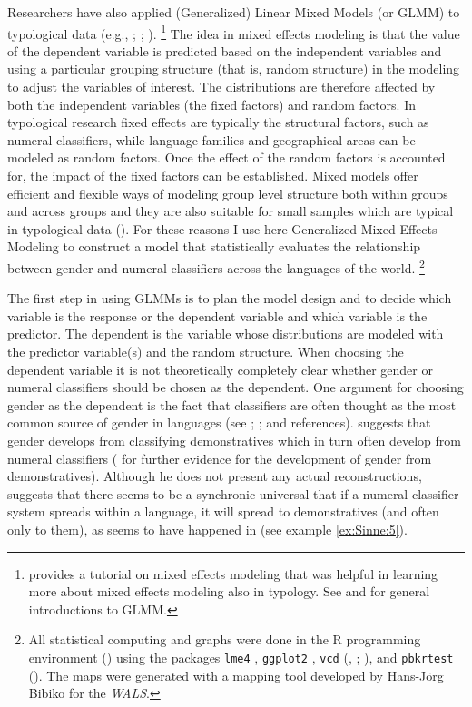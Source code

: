 \documentclass[output=collectionpaper]{langsci/langscibook}
\begin{document}
Researchers have also applied (Generalized) Linear Mixed Models (or GLMM) to typological data (e.g., \citealt{Cysouw2010}; \citealt{Jaeger2011}; \citealt{Bentz2013}).%
\footnote{\citet{Winter2013} provides a tutorial on mixed effects modeling that was helpful in learning more about mixed effects modeling also in typology. See \citet{Breslow1993} and \citet{Gelman2007} for general introductions to GLMM.} %
The idea in mixed effects modeling is that the value of the dependent variable is predicted based on the independent variables and using a particular grouping structure (that is, random structure) in the modeling to adjust the variables of interest. The distributions are therefore affected by both the independent variables (the fixed factors) and random factors. In typological research fixed effects are typically the structural factors, such as numeral classifiers, while language families and geographical areas can be modeled as random factors. Once the effect of the random factors is accounted for, the impact of the fixed factors can be established. Mixed models offer efficient and flexible ways of modeling group level structure both within groups and across groups and they are also suitable for small samples which are typical in typological data (\citealt[289--290]{Jaeger2011}). For these reasons I use here Generalized Mixed Effects Modeling to construct a model that statistically evaluates the relationship between gender and numeral classifiers across the languages of the world.%
\footnote{All statistical computing and graphs were done in the R programming environment (\citealt{RCT2017}) using the packages \texttt{lme4} \citep{Bates2015}, \texttt{ggplot2} \citep{Wickham2009}, \texttt{vcd} (\citealt{Meyer2006}, \citealt*{Meyer2015}; \citealt{Zeileis2007}), and \texttt{pbkrtest} (\citealt{Halekoh2014}). The maps were generated with a mapping tool developed by Hans-Jörg Bibiko for the \textit{WALS}.}

The first step in using GLMMs is to plan the model design and to decide which variable is the response or the dependent variable and which variable is the predictor. The dependent is the variable whose distributions are modeled with the predictor variable(s) and the random structure. When choosing the dependent variable it is not theoretically completely clear whether gender or numeral classifiers should be chosen as the dependent. One argument for choosing gender as the dependent is the fact that classifiers are often thought as the most common source of gender in languages (see \citealt[136]{Corbett1991}; \citealt[727--728]{Seifart2010}; \citealt[450--452]{Luraghi2011} and references). \citet[78--79]{Greenberg1978} suggests that gender develops from classifying demonstratives which in turn often develop from numeral classifiers (\citealt[341--342]{Harris1995} for further evidence for the development of gender from demonstratives). Although he does not present any actual reconstructions, \citet[35--36]{Greenberg1972} suggests that there seems to be a synchronic universal that if a numeral classifier system spreads within a language, it will spread to demonstratives (and often only to them), as seems to have happened in   (see example \ref{ex:Sinne:5}).
\end{document}
